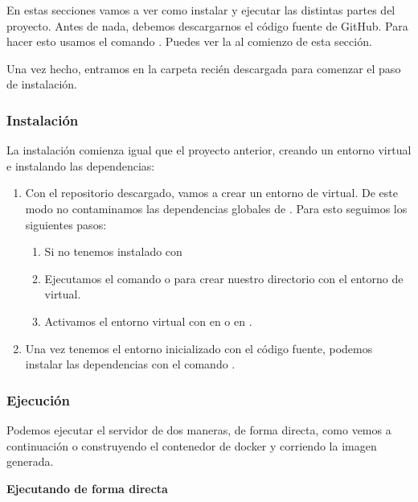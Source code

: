 En estas secciones vamos a ver como instalar y ejecutar las distintas partes del proyecto. Antes de nada, debemos descargarnos el código fuente de GitHub. Para hacer esto usamos el comando . Puedes ver la  al comienzo de esta sección.

Una vez hecho, entramos en la carpeta recién descargada para comenzar el paso de instalación.

\subsubsection{Instalación}

La instalación comienza igual que el proyecto anterior, creando un entorno virtual e instalando las dependencias:

\begin{enumerate}
  \item Con el repositorio descargado, vamos a crear un entorno de  virtual. De este modo no contaminamos las dependencias globales de . Para esto seguimos los siguientes pasos:
        \begin{enumerate}
          \item Si no tenemos instalado con 
          \item Ejecutamos el comando  o  para crear nuestro directorio  con el entorno de  virtual.
          \item Activamos el entorno virtual con  en  o  en .
        \end{enumerate}

  \item Una vez tenemos el entorno inicializado con el código fuente, podemos instalar las dependencias con el comando .
\end{enumerate}

\subsubsection{Ejecución}

Podemos ejecutar el servidor de dos maneras, de forma directa, como vemos a continuación o construyendo el contenedor de docker y corriendo la imagen generada.

\textbf{Ejecutando de forma directa}

